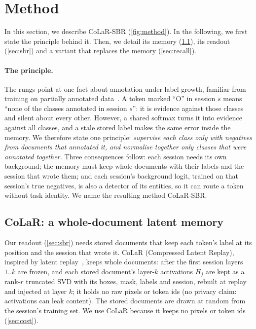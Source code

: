 \documentclass[10pt,twocolumn,letterpaper]{article}
\begin{document}
\section{Method}
\label{sec:design}
In this section, we describe CoLaR-SBR (\cref{fig:method}). In the following, we first state the principle behind it. Then, we detail its memory (\cref{sec:memory}), its readout (\cref{sec:sbr}) and a variant that replaces the memory (\cref{sec:recall}).

\paragraph{The principle.} The rungs point at one fact about annotation under label growth, familiar from training on partially annotated data~\citep{greenberg2018marginal}. A token marked ``O'' in session $s$ means ``none of the classes annotated in session $s$'': it is evidence against those classes and silent about every other. However, a shared softmax turns it into evidence against all classes, and a stale stored label makes the same error inside the memory. We therefore state one principle: \emph{supervise each class only with negatives from documents that annotated it, and normalise together only classes that were annotated together.} Three consequences follow: each session needs its own background; the memory must keep whole documents with their labels and the session that wrote them; and each session's background logit, trained on that session's true negatives, is also a detector of its entities, so it can route a token without task identity. We name the resulting method CoLaR-SBR.



\subsection{CoLaR: a whole-document latent memory}
\label{sec:memory}
Our readout (\cref{sec:sbr}) needs stored documents that keep each token's label at its position and the session that wrote it. CoLaR (Compressed Latent Replay), inspired by latent replay~\citep{hayes2020remind,pellegrini2020latent}, keeps whole documents: after the first session layers $1..k$ are frozen, and each stored document's layer-$k$ activations $H_j$ are kept as a rank-$r$ truncated SVD with its boxes, mask, labels and session, rebuilt at replay and injected at layer $k$; it holds no raw pixels or token ids (no privacy claim: activations can leak content). The stored documents are drawn at random from the session's training set. We use CoLaR because it keeps no pixels or token ids (\cref{sec:cost}).
\end{document}
